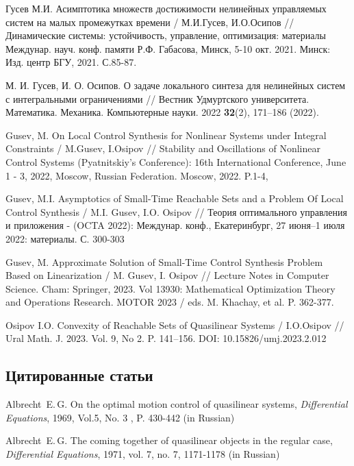 \documentclass[../main.tex]{subfiles}
\begin{document}
\begin{thebibliography}{99}
	Гусев М.И. Асимптотика множеств достижимости нелинейных управляемых систем на малых промежутках времени / М.И.Гусев, И.О.Осипов // Динамические системы: устойчивость, управление, оптимизация: материалы Междунар. науч. конф. памяти Р.Ф. Габасова, Минск, 5-10 окт. 2021. Минск: Изд. центр БГУ, 2021. С.85-87. 

	М. И. Гусев, И. О. Осипов.
	О задаче локального синтеза для нелинейных систем с интегральными ограничениями // 
	Вестник Удмуртского университета. Математика. Механика. Компьютерные науки. 2022
	\textbf{32}(2), 171–186 (2022).

	Gusev, M. 
	On Local Control Synthesis for Nonlinear Systems under Integral Constraints / 
	M.Gusev, I.Osipov // 
	Stability and Oscillations of Nonlinear Control Systems (Pyatnitskiy's Conference): 
	16th International Conference, 
	June 1 - 3, 2022, Moscow, Russian Federation. Moscow, 
	2022. P.1-4, 

	Gusev, M.I. 
	Asymptotics of Small-Time Reachable Sets and a Problem Of Local Control Synthesis / 
	M.I. Gusev, I.O. Osipov // 
	Теория оптимального управления и приложения - (OCTA 2022): 
	Междунар. конф., Екатеринбург, 27 июня–1 июля 2022: 
	материалы. С. 300-303

	Gusev, M. 
	Approximate Solution of Small-Time Control Synthesis Problem Based on Linearization / 
	M. Gusev, I. Osipov // 
	Lecture Notes in Computer Science. Cham: Springer, 
	2023. Vol 13930: 
	Mathematical Optimization Theory and Operations Research. 
	MOTOR 2023 / eds. M. Khachay, et al.
	 P. 362-377.

	Osipov I.O. 
	Convexity of Reachable Sets of Quasilinear Systems /
	I.O.Osipov // 
	Ural Math. J. 
	2023. Vol. 9, No 2. P. 141–156. 
	DOI: 10.15826/umj.2023.2.012


\subsection*{Цитированные статьи}

Albrecht~E.\,G. On the optimal motion control of quasilinear systems, \emph{Differential Equations}, 1969, Vol.5, No. 3 , P. 430-442 (in Russian)

Albrecht~E.\,G. The coming together of quasilinear objects in the regular case, \emph{Differential Equations}, 1971, vol. 7, no. 7, 1171-1178 (in Russian)


\end{thebibliography}
\end{document}
